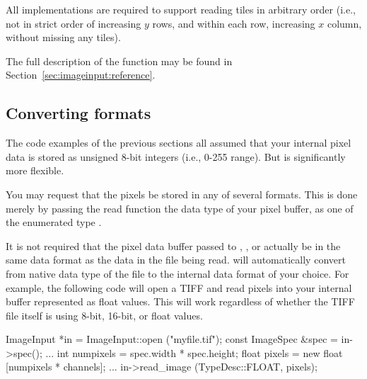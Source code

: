 All \ImageInput implementations are required to support reading tiles in
arbitrary order (i.e., not in strict order of increasing $y$ rows, and
within each row, increasing $x$ column, without missing any tiles).

The full description of the \readtile function may be found
in Section~\ref{sec:imageinput:reference}.


\subsection{Converting formats}
\label{sec:imageinput:convertingformat}

The code examples of the previous sections all assumed that your
internal pixel data is stored as unsigned 8-bit integers (i.e., 0-255
range).  But \product is significantly more flexible.  

You may request that the pixels be stored in any of several formats.
This is done merely by passing the {\cf read} function the data type
of your pixel buffer, as one of the enumerated type \TypeDesc.


It is not required that the pixel data buffer passed to \readimage,
\readscanline, or \readtile actually be in the same data format as the
data in the file being read.  \product will automatically convert from
native data type of the file to the internal data format of your choice.
For example, the following code will open a TIFF and read pixels into
your internal buffer represented as {\cf float} values.  This will work
regardless of whether the TIFF file itself is using 8-bit, 16-bit, or
float values.

\begin{code}
        ImageInput *in = ImageInput::open ("myfile.tif");
        const ImageSpec &spec = in->spec();
        ...
        int numpixels = spec.width * spec.height;
        float pixels = new float [numpixels * channels];
        ...
        in->read_image (TypeDesc::FLOAT, pixels);
\end{code}

